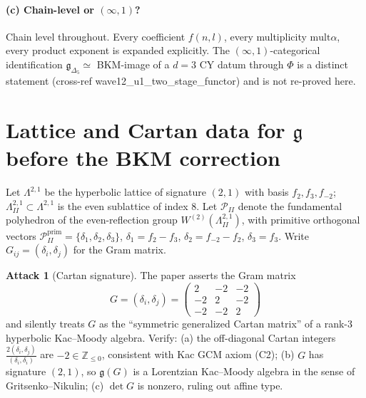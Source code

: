 \documentclass[11pt]{article}
\theoremstyle{definition}
\newtheorem{attack}[theorem]{Attack}
\providecommand{\Z}{\mathbb{Z}}
\providecommand{\g}{\mathfrak{g}}
\providecommand{\mult}{\mathrm{mult}}
\providecommand{\Lp}{\Lambda^{2,1}}
\providecommand{\LII}{\Lambda^{2,1}_{I\!I}}
\providecommand{\PII}{\mathcal{P}_{I\!I}}
\providecommand{\Deltafive}{\Delta_5}
\begin{document}
\paragraph{(c) Chain-level or $(\infty,1)$?}
Chain level throughout. Every coefficient
$f(n,l)$, every multiplicity $\mult\alpha$, every product exponent is
expanded explicitly. The $(\infty,1)$-categorical identification
$\g_{\Deltafive}\simeq$ BKM-image of a $d=3$ CY datum through $\Phi$ is
a distinct statement (cross-ref wave12\_u1\_two\_stage\_functor) and is
not re-proved here.

\section{Lattice and Cartan data for $\g$ before the BKM correction}

Let $\Lp$ be the hyperbolic lattice of signature $(2,1)$ with basis
$f_2, f_3, f_{-2}$; $\LII\subset\Lp$ is the even sublattice of index $8$.
Let $\PII$ denote the fundamental polyhedron of the even-reflection group
$W^{(2)}(\LII)$, with primitive orthogonal vectors
$\PII^{\mathrm{prim}}=\{\delta_1,\delta_2,\delta_3\}$,
$\delta_1=f_2-f_3$, $\delta_2=f_{-2}-f_2$, $\delta_3=f_3$.
Write $G_{ij}=(\delta_i,\delta_j)$ for the Gram matrix.

\begin{attack}[Cartan signature]
\label{att:cartan-signature}
The paper asserts the Gram matrix
\[
G=(\delta_i,\delta_j)=
\begin{pmatrix} 2 & -2 & -2\\ -2 & 2 & -2\\ -2 & -2 & 2\end{pmatrix}
\]
and silently treats $G$ as the ``symmetric generalized Cartan matrix''
of a rank-$3$ hyperbolic Kac--Moody algebra. Verify:
(a) the off-diagonal Cartan integers
$\tfrac{2(\delta_i,\delta_j)}{(\delta_i,\delta_i)}$ are
$-2\in\Z_{\le 0}$, consistent with Kac GCM axiom (C2);
(b) $G$ has signature $(2,1)$, so $\g(G)$ is a Lorentzian
Kac--Moody algebra in the sense of Gritsenko--Nikulin;
(c) $\det G$ is nonzero, ruling out affine type.
\end{attack}
\end{document}
